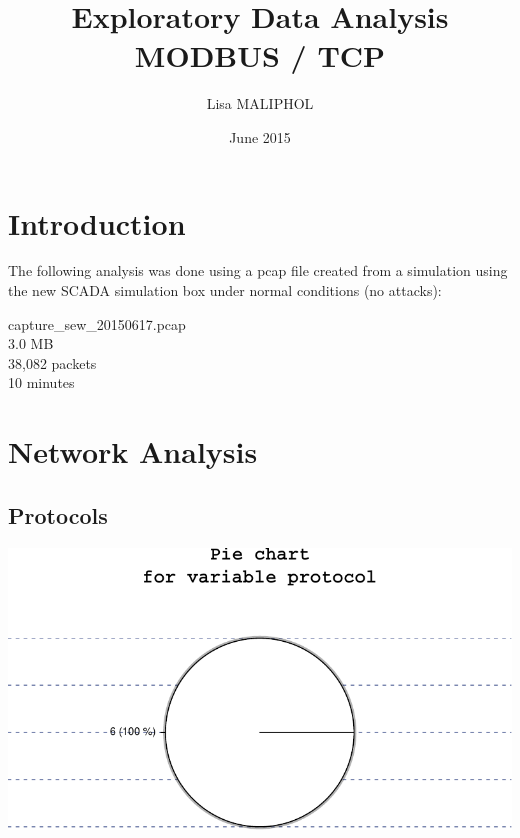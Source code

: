 \documentclass[]{article}
\title{Exploratory Data Analysis\\MODBUS / TCP}
\author{Lisa MALIPHOL}
\date{June 2015}
\begin{document}
\maketitle


\section{Introduction}\label{introduction}

The following analysis was done using a pcap file created from a
simulation using the new SCADA simulation box under normal conditions
(no attacks):

capture\_sew\_20150617.pcap\\3.0 MB\\38,082 packets\\10 minutes

\section{Network Analysis}\label{network-analysis}

\subsection{Protocols}\label{protocols}

\includegraphics{modbus_files/figure-latex/unnamed-chunk-3-1.pdf}
\end{document}
